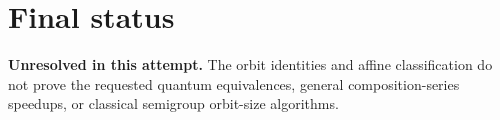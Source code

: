 \documentclass[11pt]{article}
\begin{document}
\section{Final status}
\textbf{Unresolved in this attempt.} The orbit identities and affine classification do not prove the requested quantum equivalences, general composition-series speedups, or classical semigroup orbit-size algorithms.
\end{document}
